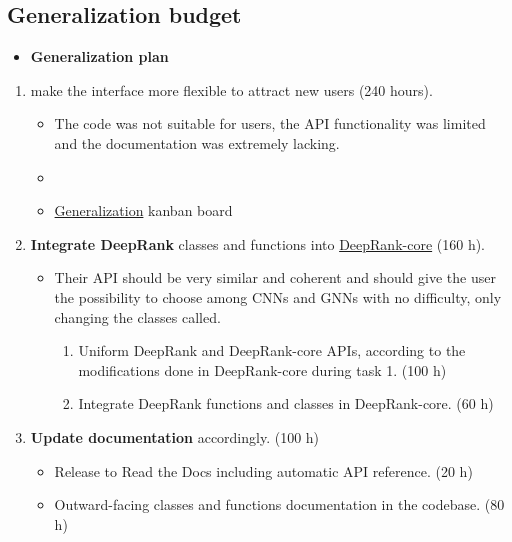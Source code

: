 \subsection*{Generalization budget}

\bigskip

\begin{itemize}
\item \textbf{Generalization plan}
\end{itemize}
\begin{enumerate}[start=1,leftmargin=.8in,label={\bfseries \textbullet{} Task \arabic*:}]
    \item make the interface more flexible to attract new users (240 hours).
    \begin{itemize}[label=o]
        \item The code was not suitable for users, the API functionality was limited and the documentation was extremely lacking.
        \item {}
        \item \href{https://github.com/DeepRank/deeprank-core/projects/6}{Generalization} kanban board
    \end{itemize}
    \item \textbf{Integrate DeepRank} classes and functions into \href{https://github.com/DeepRank/deeprank-core/blob/class_diagram/deeprankcore/uml/classes_npl.svg}{DeepRank-core} (160 h).
    \begin{itemize}
        \item Their API should be very similar and coherent and should give the user the
possibility to choose among CNNs and GNNs with no difficulty, only changing the classes called.
        \begin{enumerate}[label=\roman*.]
            \item Uniform DeepRank and DeepRank-core APIs, according to the modifications done
in DeepRank-core during task 1. (100 h)
            \item Integrate DeepRank functions and classes in DeepRank-core. (60 h)
        \end{enumerate}
    \end{itemize} 
    \item \textbf{Update documentation} accordingly. (100 h)
    \begin{itemize}[label=o]
        \item Release to Read the Docs including automatic API reference. (20 h)
        \item Outward-facing classes and functions documentation in the codebase. (80 h)

\end{itemize}
\end{enumerate}
